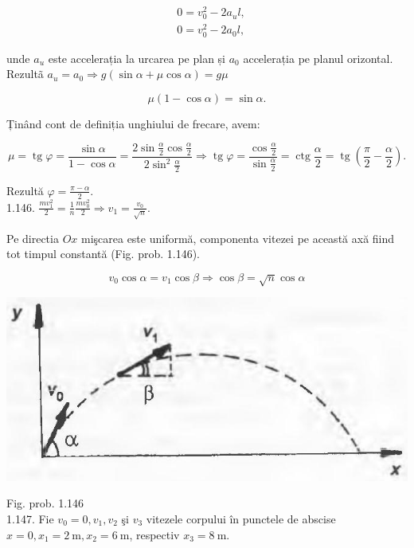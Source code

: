 \documentclass[10pt]{article}
\begin{document}
$$
\begin{aligned}
& 0=v_{0}^{2}-2 a_{u} l, \\
& 0=v_{0}^{2}-2 a_{0} l,
\end{aligned}
$$

unde $a_{u}$ este accelerația la urcarea pe plan și $a_{0}$ accelerația pe planul orizontal.\\
Rezultã $a_{u}=a_{0} \Rightarrow g(\sin \alpha+\mu \cos \alpha)=g \mu$

$$
\mu(1-\cos \alpha)=\sin \alpha .
$$

Ținând cont de definiția unghiului de frecare, avem:

$$
\mu=\operatorname{tg} \varphi=\frac{\sin \alpha}{1-\cos \alpha}=\frac{2 \sin \frac{\alpha}{2} \cos \frac{\alpha}{2}}{2 \sin ^{2} \frac{\alpha}{2}} \Rightarrow \operatorname{tg} \varphi=\frac{\cos \frac{\alpha}{2}}{\sin \frac{\alpha}{2}}=\operatorname{ctg} \frac{\alpha}{2}=\operatorname{tg}\left(\frac{\pi}{2}-\frac{\alpha}{2}\right) .
$$

Rezultă $\varphi=\frac{\pi-\alpha}{2}$.\\
1.146. $\frac{m v_{1}^{2}}{2}=\frac{1}{n} \frac{m v_{0}^{2}}{2} \Rightarrow v_{1}=\frac{v_{0}}{\sqrt{n}}$.

Pe directia $O x$ mişcarea este uniformă, componenta vitezei pe această axă fiind tot timpul constantă (Fig. prob. 1.146).

$$
v_{0} \cos \alpha=v_{1} \cos \beta \Rightarrow \cos \beta=\sqrt{n} \cos \alpha
$$

\begin{center}
\includegraphics[max width=\textwidth]{2025_07_01_5b3ff9fa0d508c8e9f17g-229}
\end{center}

Fig. prob. 1.146\\
1.147. Fie $v_{0}=0, v_{1}, v_{2}$ şi $v_{3}$ vitezele corpului în punctele de abscise $x=0, x_{1}=2 \mathrm{~m}, x_{2}=6 \mathrm{~m}$, respectiv $x_{3}=8 \mathrm{~m}$.
\end{document}
